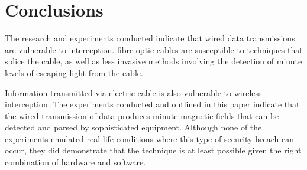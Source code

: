 \documentclass{article}
\begin{document}
\section{Conclusions}

The research and experiments conducted indicate that wired data transmissions are vulnerable to interception. fibre optic cables are susceptible to techniques that splice the cable, as well as less invasive methods involving the detection of minute levels of escaping light from the cable.

Information transmitted via electric cable is also vulnerable to wireless interception. The experiments conducted and outlined in this paper indicate that the wired transmission of data produces minute magnetic fields that can be detected and parsed by sophisticated equipment. Although none of the experiments emulated real life conditions where this type of security breach can occur, they did demonstrate that the technique is at least possible given the right combination of hardware and software.

\newpage{}

\end{document}
